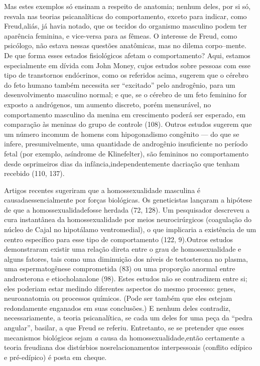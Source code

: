  Mas estes exemplos só ensinam a respeito de anatomia; nenhum deles, por
si só, resvala nas teorias psicanalíticas do comportamento, exceto para
indicar, como Freud,\idxfreud[|(] aliás, já havia notado, que os tecidos do
organismo masculino podem ter aparência feminina, e vice-versa para as
fêmeas. O interesse de Freud, como psicólogo, não estava nessas
questões anatômicas, mas no dilema\idxquest{} corpo--mente.\idxfreudmente{} De que forma esses
estados fisiológicos afetam o comportamento? Aqui, estamos
especialmente em dívida com John Money,\idxmoney{} cujos estudos sobre pessoas com
esse tipo de transtornos endócrinos, como os referidos acima, sugerem
que o cérebro do feto humano também necessita ser
``excitado'' pelo androgênio, para um
desenvolvimento masculino normal; e que, se o cérebro de um feto
feminino for exposto a andrógenos, um aumento discreto, porém
mensurável, no comportamento masculino da menina em crescimento poderá
ser esperado, em comparação às meninas do grupo de controle (108).
Outros estudos sugerem que um número incomum de homens com
hipogonadismo congênito --- do que se infere, presumivelmente, uma
quantidade de androgênio\idxandrn{} insuficiente no período fetal (por exemplo, a\idxsexod[|)]
síndrome de Klinefelter),\idxkline{} são femininos no comportamento desde os\idxsexopiden[|)]
primeiros dias da infância,\idxbissedese[|)] independentemente da\idxcondfsupr[|)] criação que tenham
recebido (110, 137).\idxprenat[|)]

 Artigos recentes sugeriram que a homossexualidade\idxgenethomo{} masculina é causada\idxsexophomo[|(]
essencialmente por forças biológicas. Os geneticistas lançaram a
hipótese de que a homossexualidade\idxhomosbiol[|(] fosse herdada\idxhomoshera{} (72, 128). Um
pesquisador descreveu a cura instantânea da homossexualidade por meios
neurocirúrgicos\idxhomostrat{} (coagulação do núcleo de Cajal no hipotálamo
ventromedial), o que implicaria a existência de um centro específico
para esse tipo de comportamento (122, 9).\idxidenpre[|)] Outros estudos demonstraram
existir uma relação direta entre o grau de homossexualidade e alguns
fatores, tais como uma diminuição dos níveis de testosterona no plasma,
uma espermatogênese comprometida (83) ou uma proporção anormal entre
androsterona e etiocholanalone (98).\idxhormhomo{} Estes estudos não se contradizem
entre si; eles poderiam estar medindo diferentes aspectos do mesmo
processo: genes, neuroanatomia ou processos químicos. (Pode ser também
que eles estejam redondamente enganados em suas conclusões.) E nenhum
deles contradiz, necessariamente, a teoria psicanalítica, se cada um
deles for uma peça da ``pedra angular'',
basilar, a que Freud se referiu. Entretanto, se se pretender que esses
mecanismos biológicos sejam \textit{a} causa da homossexualidade,\idxhomosbiol[|)] então
certamente a teoria freudiana dos distúrbios nos\idxhormdese[|)] relacionamentos
interpessoais (conflito edípico e pré-edípico)\idxconfe{} é posta em cheque.\idxsexophomo[|)]

